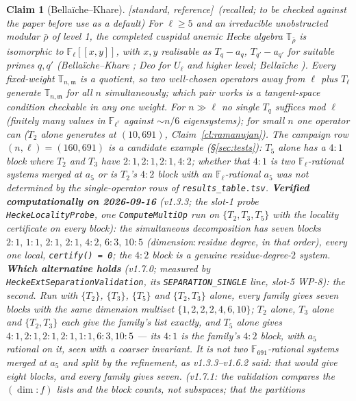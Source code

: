 \documentclass[11pt]{article}
\newtheorem{claim}[theorem]{Claim}
\theoremstyle{remark}
\newcommand{\F}{\mathbb{F}}
\newcommand{\Fl}{\F_\ell}
\newcommand{\Flr}{\F_{\ell^r}}
\newcommand{\T}{\mathbb{T}}
\newcommand{\m}{\mathfrak{m}}
\newcommand{\STD}{\textsf{[standard, reference]}}
\begin{document}
\begin{claim}[Bella\"iche--Khare]\label{cl:bk}\STD\ (recalled; to be checked against the paper before use as a default)
For $\ell\ge5$ and an irreducible unobstructed modular $\bar\rho$ of level 1, the completed
cuspidal anemic Hecke algebra $\T_{\bar\rho}$ is isomorphic to $\Fl[[x,y]]$, with $x,y$
realisable as $T_q-a_q$, $T_{q'}-a_{q'}$ for suitable primes $q,q'$ (Bella\"iche--Khare
\cite{bk}; Deo \cite{deo} for $U_\ell$ and higher level; Bella\"iche \cite{eigenbook}). Every
fixed-weight $\T_{n,\m}$ is a quotient, so two well-chosen operators away from $\ell$ plus
$T_\ell$ generate $\T_{n,\m}$ for all $n$ simultaneously; which pair works is a tangent-space
condition checkable in any one weight. For $n\gg\ell$ no single $T_q$ suffices mod $\ell$
(finitely many values in $\Flr$ against $\sim n/6$ eigensystems); for small $n$ one operator
can ($T_2$ alone generates at $(10,691)$, Claim~\ref{cl:ramanujan}). The campaign row
$(n,\ell)=(160,691)$ is a \emph{candidate} example (\S\ref{sec:tests}): $T_5$ alone
has a $4{:}1$ block where $T_2$ and $T_3$ have $2{:}1,2{:}1,2{:}1,4{:}2$; whether that $4{:}1$
is two $\Fl$-rational systems merged at $a_5$ or is $T_2$'s $4{:}2$ block with an
$\Fl$-rational $a_5$ was not determined by the single-operator rows of
\texttt{results\_table.tsv}. \textbf{Verified computationally on 2026-09-16} (v1.3.3; the
slot-1 probe \texttt{HeckeLocalityProbe}, one \texttt{ComputeMultiOp} run on
$\{T_2,T_3,T_5\}$ with the locality certificate on every block): the simultaneous
decomposition has seven blocks
$2{:}1,\,1{:}1,\,2{:}1,\,2{:}1,\,4{:}2,\,6{:}3,\,10{:}5$ (dimension${:}$residue degree, in
that order), every one local, \texttt{certify() = 0}; the $4{:}2$ block is a genuine
residue-degree-$2$ system. \textbf{Which alternative holds} (v1.7.0; measured by
\texttt{HeckeExtSeparationValidation}, its \texttt{SEPARATION\_SINGLE} line, slot-5 WP-8): the
\emph{second}. Run with $\{T_2\}$, $\{T_3\}$, $\{T_5\}$ and $\{T_2,T_3\}$ alone, every family
gives seven blocks with the same dimension multiset $\{1,2,2,2,4,6,10\}$; $T_2$ alone, $T_3$
alone and $\{T_2,T_3\}$ each give the family's list exactly, and $T_5$ alone gives
$4{:}1,2{:}1,2{:}1,2{:}1,1{:}1,6{:}3,10{:}5$ --- its $4{:}1$ is the family's $4{:}2$ block,
with $a_5$ rational on it, seen with a coarser invariant. It is not two
$\F_{691}$-rational systems merged at $a_5$ and split by the refinement, as v1.3.3--v1.6.2
said: that would give eight blocks, and every family gives seven. (v1.7.1: the validation
compares the $(\dim{:}f)$ lists and the block counts, not subspaces; that the partitions

\end{claim}
\end{document}
